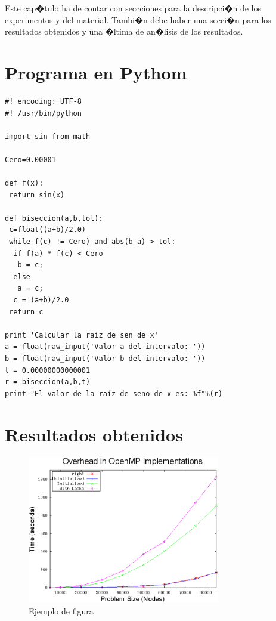 
Este cap�tulo ha de contar con seccciones para la descripci�n de los experimentos 
y del material.
%
Tambi�n debe haber una secci�n para los resultados obtenidos y una �ltima de 
an�lisis de los resultados.


\section{Programa en Pythom}
\label{3:sec:1}
\begin{verbatim}
#! encoding: UTF-8
#! /usr/bin/python 

import sin from math

Cero=0.00001

def f(x):
 return sin(x)

def biseccion(a,b,tol):
 c=float((a+b)/2.0)
 while f(c) != Cero) and abs(b-a) > tol:
  if f(a) * f(c) < Cero
   b = c;
  else
   a = c;
  c = (a+b)/2.0
 return c

print 'Calcular la raíz de sen de x'
a = float(raw_input('Valor a del intervalo: '))
b = float(raw_input('Valor b del intervalo: '))
t = 0.00000000000001
r = biseccion(a,b,t)
print "El valor de la raíz de seno de x es: %f"%(r)
\end{verbatim}


\section{Resultados obtenidos}
\label{3:sec:2}

\begin{figure}[!th]
\begin{center}
\includegraphics[width=0.75\textwidth]{images/figura1.eps}
\caption{Ejemplo de figura}
\label{fig:1}
\end{center}
\end{figure}





